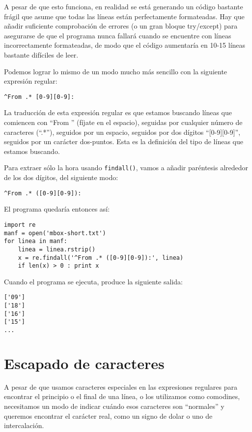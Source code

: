 A pesar de que esto funciona, en realidad se está generando un código bastante frágil que asume que todas las líneas
están perfectamente formateadas. Hay que añadir suficiente comprobación de errores (o un gran bloque try/except)
para asegurarse de que el programa nunca fallará cuando se encuentre con líneas incorrectamente formateadas, de
modo que el código aumentaría en 10-15 líneas bastante difíciles de leer.

Podemos lograr lo mismo de un modo mucho más sencillo con la siguiente expresión regular:

\beforeverb
\begin{verbatim}
^From .* [0-9][0-9]:
\end{verbatim}
\afterverb
%
La traducción de esta expresión regular es que estamos buscando líneas que comiencen con ``From ''
(fíjate en el espacio), seguidas por cualquier número de caracteres (``.*''), seguidos por un espacio,
seguidos por dos dígitos ``[0-9][0-9]'', seguidos por un carácter dos-puntos. Esta es la definición del tipo de
líneas que estamos buscando.

Para extraer sólo la hora usando {\tt findall()}, vamos a añadir paréntesis alrededor de los dos dígitos,
del siguiente modo:

\beforeverb
\begin{verbatim}
^From .* ([0-9][0-9]):
\end{verbatim}
\afterverb
%
El programa quedaría entonces así:

\beforeverb
\begin{verbatim}
import re
manf = open('mbox-short.txt')
for linea in manf:
    linea = linea.rstrip()
    x = re.findall('^From .* ([0-9][0-9]):', linea)
    if len(x) > 0 : print x
\end{verbatim}
\afterverb
%
Cuando el programa se ejecuta, produce la siguiente salida:

\beforeverb
\begin{verbatim}
['09']
['18']
['16']
['15']
...
\end{verbatim}
\afterverb
%
\section{Escapado de caracteres}

A pesar de que usamos caracteres especiales en las expresiones regulares para encontrar el principio o el final
de una línea, o los utilizamos como comodines, necesitamos un modo de indicar cuándo esos caracteres son
``normales'' y queremos encontrar el carácter real, como un signo de dolar o uno de intercalación.

